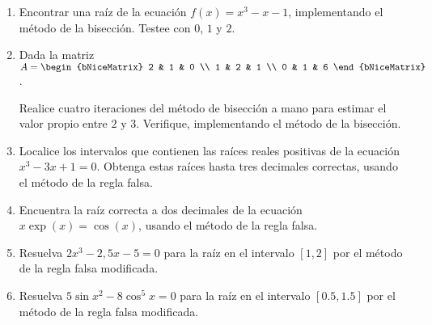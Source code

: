 \documentclass[
  spanish,
  8pt,
  utf8,
  xcolor=table,
  handout,
  aspectratio=169,
  professionalfonts,
  notheorems,
  mathserif,
]{beamer}
\newcounter{savedenum}
\newcommand*{\saveenum}{\setcounter{savedenum}{\theenumi}}
\newcommand*{\resume}{\setcounter{enumi}{\thesavedenum}}
\begin{document}
\begin{frame}
	\begin{enumerate}
		\resume

		\item

		      Encontrar una raíz de la ecuación
		      \begin{math}
			      f\left(x\right)=
			      x^{3}-x-1
		      \end{math},
		      implementando el método de la bisección.
		      Testee con $0$, $1$ y $2$.

		\item

		      Dada la matriz
		      \begin{math}
			      A=
			      \begin{bNiceMatrix}
				      2 & 1 & 0 \\
				      1 & 2 & 1 \\
				      0 & 1 & 6
			      \end{bNiceMatrix}
		      \end{math}.

		      Realice cuatro iteraciones del método de bisección a mano
		      para estimar el valor propio entre $2$ y $3$.
		      Verifique, implementando el método de la bisección.

		\item

		      Localice los intervalos que contienen las raíces reales
		      positivas de la ecuación $x^{3}-3x+1=0$.
		      Obtenga estas raíces hasta tres decimales correctas, usando
		      el método de la regla falsa.

		\item

		      Encuentra la raíz correcta a dos decimales de la ecuación
		      \begin{math}
			      x\exp\left(x\right)=
			      \cos\left(x\right)
		      \end{math},
		      usando el método de la regla falsa.

		\item

		      Resuelva $2x^{3}-2,5x-5=0$ para la raíz en el intervalo
		      $\left[1,2\right]$ por el método de la regla falsa
		      modificada.

		\item

		      Resuelva $5\sin x^{2}-8\cos ^{5}x=0$ para la raíz en el
		      intervalo $\left[0.5,1.5\right]$ por el método de la regla
		      falsa modificada.
		      \saveenum
	\end{enumerate}
\end{frame}
\end{document}
